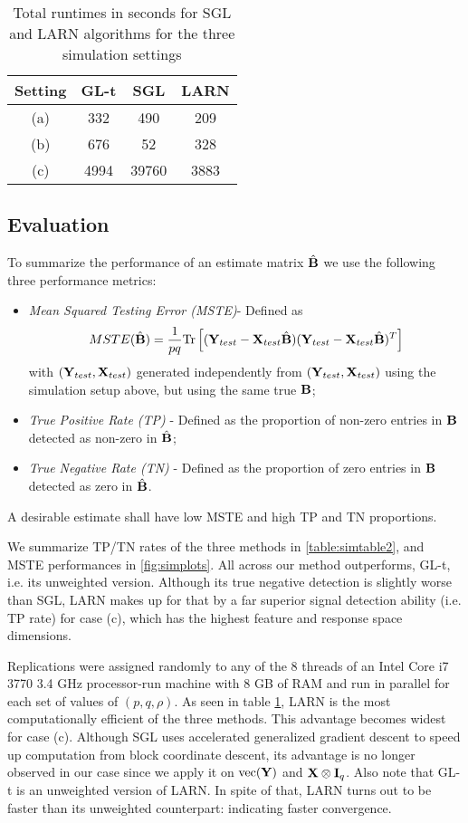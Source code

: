 \begin{table}[t]
\centering
    \begin{tabular}{c|ccc}
    \hline
    Setting & GL-t & SGL    & LARN \\ \hline
    (a)     & 332 & 490    & 209  \\
    (b)       & 676 & 52  & 328 \\
    (c)       & 4994 & 39760 & 3883 \\ \hline
    \end{tabular}
    \caption{Total runtimes in seconds for SGL and LARN algorithms for the three simulation settings}
    \label{table:simtimetable}
\end{table}

\subsection{Evaluation}
To summarize the performance of an estimate matrix $\hat{{\mathbf{B}}}$ we use the following three performance metrics:
%
\begin{itemize}
\item \textit{Mean Squared Testing Error (MSTE)}- Defined as
%
$$
MSTE( \hat {{\mathbf{B}}}) = \frac{1}{pq} \text{Tr} \left[({\mathbf{Y}}_{test} - {\mathbf{X}}_{test} \hat {{\mathbf{B}}})({\mathbf{Y}}_{test} - {\mathbf{X}}_{test} \hat {{\mathbf{B}}})^T \right]
$$
%
with $({\mathbf{Y}}_{test}, {\mathbf{X}}_{test})$ generated independently from $({\mathbf{Y}}_{test}, {\mathbf{X}}_{test})$ using the simulation setup above, but using the same true ${\mathbf{B}}$;

\item\textit{True Positive Rate (TP)} - Defined as the proportion of non-zero entries in ${\mathbf{B}}$ detected as non-zero in $\hat{{\mathbf{B}}}$;

\item\textit{True Negative Rate (TN)} - Defined as the proportion of zero entries in ${\mathbf{B}}$ detected as zero in $\hat{{\mathbf{B}}}$.
\end{itemize}
%
A desirable estimate shall have low MSTE and high TP and TN proportions.

We summarize TP/TN rates of the three methods in \ref{table:simtable2}, and MSTE performances in \ref{fig:simplots}. All across our method outperforms, GL-t, i.e. its unweighted version. Although its true negative detection is slightly worse than SGL, LARN makes up for that by a far superior signal detection ability (i.e. TP rate) for case (c), which has the highest feature and response space dimensions.

Replications were assigned randomly to any of the 8 threads of an Intel Core i7 3770 3.4 GHz processor-run machine with 8 GB of RAM and run in parallel for each set of values of $(p,q,\rho)$. As seen in table \ref{table:simtimetable}, LARN is the most computationally efficient of the three methods. This advantage becomes widest for case (c). Although SGL uses accelerated generalized gradient descent to speed up computation from block coordinate descent, its advantage is no longer observed in our case since we apply it on $\text{vec}({\mathbf{Y}})$ and ${\mathbf{X}} \otimes {\mathbf{I}}_q$. Also note that GL-t is an unweighted version of LARN. In spite of that, LARN turns out to be faster than its unweighted counterpart: indicating faster convergence.

